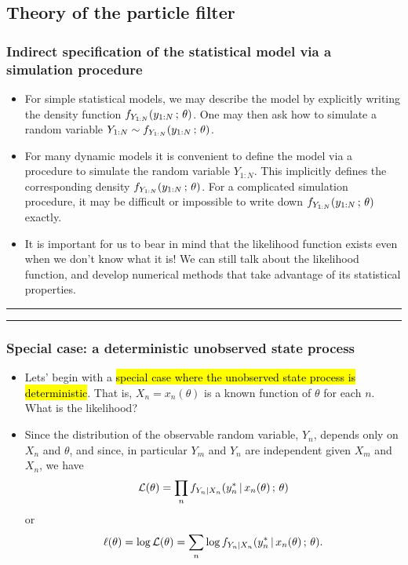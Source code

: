 \documentclass[]{article}
\begin{document}
\subsection{Theory of the particle
filter}\label{theory-of-the-particle-filter}

\subsubsection{Indirect specification of the statistical model via a
simulation
procedure}\label{indirect-specification-of-the-statistical-model-via-a-simulation-procedure}

\begin{itemize}
\item
  For simple statistical models, we may describe the model by explicitly
  writing the density function \(f_{Y_{1:N}}(y_{1:N}\, ; \,\theta)\).
  One may then ask how to simulate a random variable
  \(Y_{1:N}\sim f_{Y_{1:N}}(y_{1:N}\, ; \,\theta)\).
\item
  For many dynamic models it is convenient to define the model via a
  procedure to simulate the random variable \(Y_{1:N}\). This implicitly
  defines the corresponding density
  \(f_{Y_{1:N}}(y_{1:N}\, ; \,\theta)\). For a complicated simulation
  procedure, it may be difficult or impossible to write down
  \(f_{Y_{1:N}}(y_{1:N}\, ; \,\theta)\) exactly.
\item
  It is important for us to bear in mind that the likelihood function
  exists even when we don't know what it is! We can still talk about the
  likelihood function, and develop numerical methods that take advantage
  of its statistical properties.
\end{itemize}

\begin{center}\rule{0.5\linewidth}{\linethickness}\end{center}

\begin{center}\rule{0.5\linewidth}{\linethickness}\end{center}

\subsubsection{Special case: a deterministic unobserved state
process}\label{special-case-a-deterministic-unobserved-state-process}

\begin{itemize}
\item
  Lets' begin with a \hl{special case where the unobserved state process is
  deterministic}. That is, \(X_{n}=x_n(\theta)\) is a known function of
  \(\theta\) for each \(n\). What is the likelihood?
\item
  Since the distribution of the observable random variable, \(Y_n\),
  depends only on \(X_n\) and \(\theta\), and since, in particular
  \(Y_{m}\) and \(Y_{n}\) are independent given \(X_{m}\) and \(X_{n}\),
  we have
  \[\mathcal{L}(\theta) = \prod_{n} f_{Y_n|X_n}(y_n^*{\, | \,} x_n(\theta)\, ; \, \theta)\]
  or
  \[\ell(\theta) = \log\mathcal{L}(\theta) = \sum_{n} \log f_{Y_n|X_n}(y_n^*{\, | \,} x_n(\theta)\, ; \, \theta).\]
\end{itemize}
\end{document}
